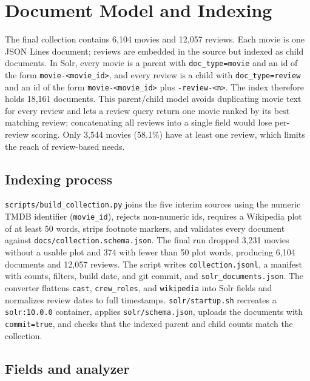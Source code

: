 \documentclass[sigconf]{acmart}
\begin{document}

\section{Document Model and Indexing}
\label{sec:indexing}

The final collection contains 6{,}104 movies and 12{,}057 reviews. Each movie is
one JSON Lines document; reviews are embedded in the source but indexed as child
documents. In Solr, every movie is a parent with \texttt{doc\_type=movie} and an id
of the form \texttt{movie-<movie\_id>}, and every review is a child with
\texttt{doc\_type=review} and an id of the form \texttt{movie-<movie\_id>} plus
\texttt{-review-<n>}. The index therefore holds 18{,}161
documents. This parent/child model avoids duplicating movie text for every review
and lets a review query return one movie ranked by its best matching review;
concatenating all reviews into a single field would lose per-review scoring. Only
3{,}544 movies (58.1\%) have at least one review, which limits the reach of
review-based needs.

\subsection{Indexing process}
\label{sec:indexing-process}

\texttt{scripts/build\_collection.py} joins the five interim sources using the
numeric TMDB identifier (\texttt{movie\_id}), rejects non-numeric ids, requires a
Wikipedia plot of at least 50 words, strips footnote markers, and validates every
document against
\texttt{docs/collection.schema.json}. The final run dropped 3{,}231 movies without
a usable plot and 374 with fewer than 50 plot words, producing 6{,}104 documents
and 12{,}057 reviews. The script writes \texttt{collection.jsonl}, a manifest with
counts, filters, build date, and git commit, and \texttt{solr\_documents.json}.
The converter flattens \texttt{cast}, \texttt{crew\_roles}, and \texttt{wikipedia}
into Solr fields and normalizes review dates to full timestamps.
\texttt{solr/startup.sh} recreates a \texttt{solr:10.0.0} container, applies
\texttt{solr/schema.json}, uploads the documents with \texttt{commit=true}, and
checks that the indexed parent and child counts match the collection.

\subsection{Fields and analyzer}
\label{sec:fields}
\end{document}
